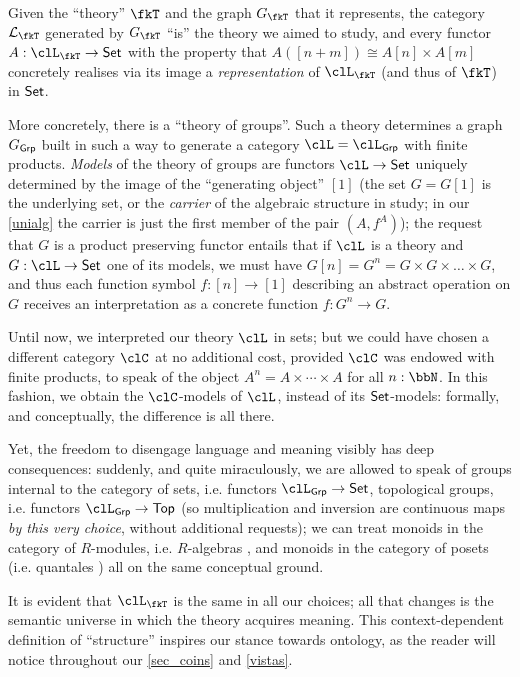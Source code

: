 Given the ``theory'' $\fkT$ and the graph $G_{\fkT}$ that it represents, the category $\mathcal{L}_{\fkT}$ generated by $G_\fkT$ ``is'' the theory we aimed to study, and every functor $A: \clL_{\fkT} \to \Set$ with the property that $A([n+m]) \cong A[n] \times A[m]$ concretely realises via its image a \emph{representation} of $\clL_\fkT$ (and thus of $\fkT$) in $\mathsf{Set}$.
\begin{remark}\label{rmk_explicit_theoer}
    More concretely, there is a ``theory of groups''. Such a theory determines a graph $G_{\mathsf{Grp}}$ built in such a way to generate a category $\clL=\clL_{\cate{Grp}}$ with finite products. \emph{Models} of the theory of groups are functors $\clL \to \Set$ uniquely determined by the image of the ``generating object'' $[1]$ (the set $G=G[1]$ is the underlying set, or the \emph{carrier} of the algebraic structure in study; in our \autoref{unialg} the carrier is just the first member of the pair $(A,f^A)$); the request that $G$ is a product preserving functor entails that if $\clL$ is a theory and $G: \clL \to \Set$ one of its models, we must have $G[n]=G^n = G \times G \times\dots\times G$, and thus each function symbol $f: [n]\to [1]$ describing an abstract operation on $G$ receives an interpretation as a concrete function $f: G^n \to G$.
\end{remark}
Until now, we interpreted our theory $\clL$ in sets; but we could have chosen a different category $\clC$ at no additional cost, provided $\clC$ was endowed with finite products, to speak of the object $A^n = A\times \cdots\times A$ for all $n: \bbN$. In this fashion, we obtain the $\clC$-models of $\clL$, instead of its $\mathsf{Set}$-models: formally, and conceptually, the difference is all there.

Yet, the freedom to disengage language and meaning visibly has deep consequences: suddenly, and quite miraculously, we are allowed to speak of groups internal to the category of sets, i.e. functors $\clL_{\cate{Grp}} \to \Set$, topological groups, i.e. functors $\clL_{\cate{Grp}} \to \cate{Top}$ (so multiplication and inversion are continuous maps \emph{by this very choice}, without additional requests); we can treat monoids in the category of $R$-modules, i.e. $R$-algebras \cite[IV]{book337527}, and monoids in the category of posets (i.e. quantales \cite{Paseka2000}) all on the same conceptual ground.

It is evident that $\clL_{\fkT}$ is the same in all our choices; all that changes is the semantic universe in which the theory acquires meaning. This context-dependent definition of ``structure'' inspires our stance towards ontology, as the reader will notice throughout our \autoref{sec_coins} and \autoref{vistas}.

